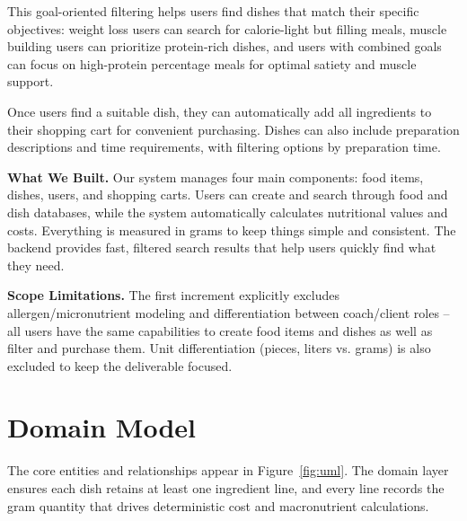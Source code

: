 \documentclass[11pt]{article}
\begin{document}
This goal-oriented filtering helps users find dishes that match their specific objectives: weight loss users can search for calorie-light but filling meals, muscle building users can prioritize protein-rich dishes, and users with combined goals can focus on high-protein percentage meals for optimal satiety and muscle support.

Once users find a suitable dish, they can automatically add all ingredients to their shopping cart for convenient purchasing. Dishes can also include preparation descriptions and time requirements, with filtering options by preparation time.

\textbf{What We Built.} Our system manages four main components: food items, dishes, users, and shopping carts. Users can create and search through food and dish databases, while the system automatically calculates nutritional values and costs. Everything is measured in grams to keep things simple and consistent. The backend provides fast, filtered search results that help users quickly find what they need.

\textbf{Scope Limitations.} The first increment explicitly excludes allergen/micronutrient modeling and differentiation between coach/client roles – all users have the same capabilities to create food items and dishes as well as filter and purchase them. Unit differentiation (pieces, liters vs. grams) is also excluded to keep the deliverable focused.

\section{Domain Model}

The core entities and relationships appear in Figure~\ref{fig:uml}. The domain layer ensures each dish retains at least one ingredient line, and every line records the gram quantity that drives deterministic cost and macronutrient calculations.
\end{document}
